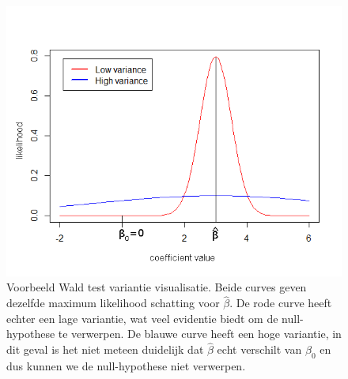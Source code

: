 \begin{figure}
	\centering
	\includegraphics[scale=.7]{images/wald_test}
	\caption{Voorbeeld Wald test variantie visualisatie. Beide curves geven dezelfde maximum likelihood schatting voor $\hat{\beta}$. De rode curve heeft echter een lage variantie, wat veel evidentie biedt om de null-hypothese te verwerpen. De blauwe curve heeft een hoge variantie, in dit geval is het niet meteen duidelijk dat $\hat{\beta}$ echt verschilt van $\beta_{0}$ en dus kunnen we de null-hypothese niet verwerpen.}
	\label{fig:D:evaluation-wald-test}
\end{figure}

